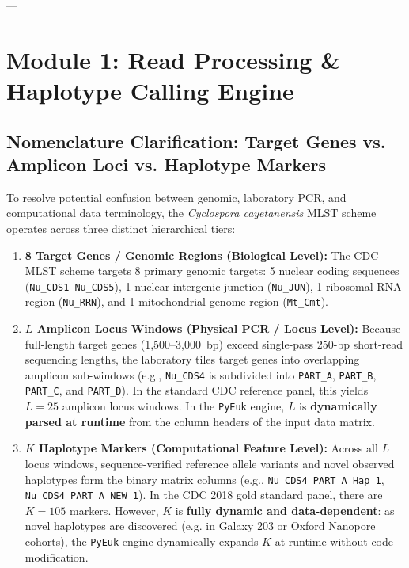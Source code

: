 \documentclass[11pt,a4paper]{article}
\begin{document}
---

\section{Module 1: Read Processing \& Haplotype Calling Engine}

\subsection{Nomenclature Clarification: Target Genes vs. Amplicon Loci vs. Haplotype Markers}

To resolve potential confusion between genomic, laboratory PCR, and computational data terminology, the \textit{Cyclospora cayetanensis} MLST scheme operates across three distinct hierarchical tiers:

\begin{enumerate}[leftmargin=*]
    \item \textbf{8 Target Genes / Genomic Regions (Biological Level):} The CDC MLST scheme targets 8 primary genomic targets: 5 nuclear coding sequences (\texttt{Nu\_CDS1}--\texttt{Nu\_CDS5}), 1 nuclear intergenic junction (\texttt{Nu\_JUN}), 1 ribosomal RNA region (\texttt{Nu\_RRN}), and 1 mitochondrial genome region (\texttt{Mt\_Cmt}).
    \item \textbf{$L$ Amplicon Locus Windows (Physical PCR / Locus Level):} Because full-length target genes (1,500--3,000~bp) exceed single-pass 250-bp short-read sequencing lengths, the laboratory tiles target genes into overlapping amplicon sub-windows (e.g., \texttt{Nu\_CDS4} is subdivided into \texttt{PART\_A}, \texttt{PART\_B}, \texttt{PART\_C}, and \texttt{PART\_D}). In the standard CDC reference panel, this yields $L=25$ amplicon locus windows. In the \texttt{PyEuk} engine, $L$ is \textbf{dynamically parsed at runtime} from the column headers of the input data matrix.
    \item \textbf{$K$ Haplotype Markers (Computational Feature Level):} Across all $L$ locus windows, sequence-verified reference allele variants and novel observed haplotypes form the binary matrix columns (e.g., \texttt{Nu\_CDS4\_PART\_A\_Hap\_1}, \texttt{Nu\_CDS4\_PART\_A\_NEW\_1}). In the CDC 2018 gold standard panel, there are $K=105$ markers. However, $K$ is \textbf{fully dynamic and data-dependent}: as novel haplotypes are discovered (e.g. in Galaxy 203 or Oxford Nanopore cohorts), the \texttt{PyEuk} engine dynamically expands $K$ at runtime without code modification.
\end{enumerate}
\end{document}
